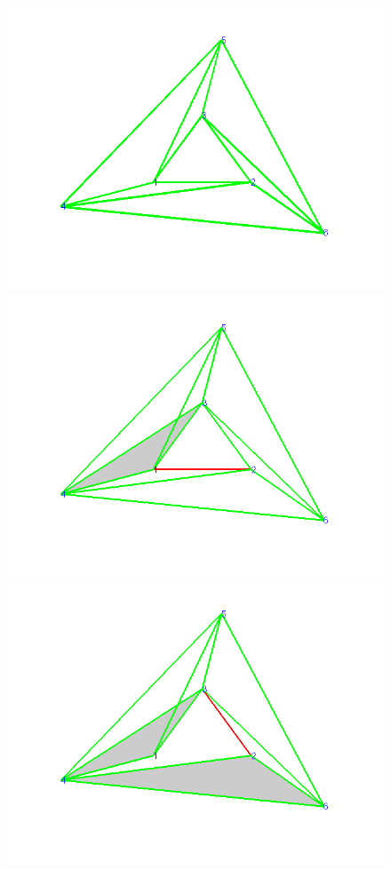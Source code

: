 \documentclass[12pt]{article}
\begin{document}
\begin{figure}
\includegraphics[scale = .45]{Pictures/triEx1.png}
\includegraphics[scale = .45]{Pictures/triExD1.png}
\includegraphics[scale = .45]{Pictures/triExD2.png}

\end{figure}
\end{document}
